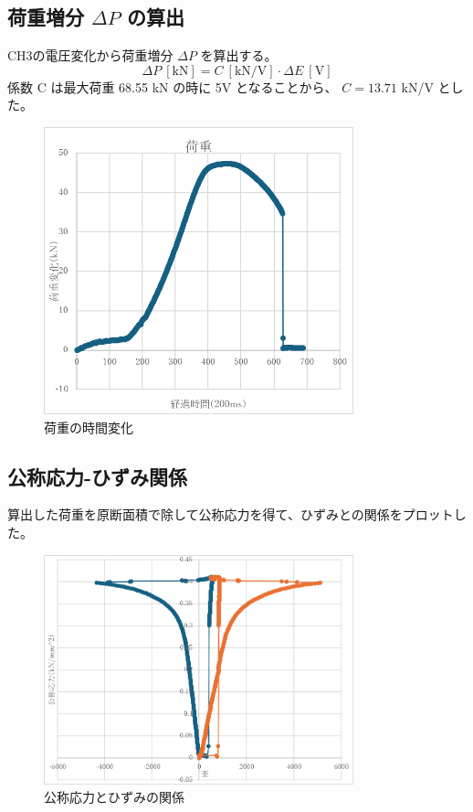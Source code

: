 \documentclass[11pt, a4paper, dvipdfmx]{jsreport}
\begin{document}
\subsection{荷重増分 $\Delta P$ の算出}
CH3の電圧変化から荷重増分 $\Delta P$ を算出する。
$$
\Delta P\ [\text{kN}] = C\ [\text{kN/V}] \cdot \Delta E\ [\text{V}]
$$
係数 C は最大荷重 68.55 kN の時に 5V となることから、 $C=13.71$ kN/V とした。
\begin{figure}[H]
    \centering
    \includegraphics[width=0.8\textwidth]{summer/ship-experiment/tension/pictures/load_change.png}
    \caption{荷重の時間変化}
    \label{fig:load_change}
\end{figure}

\subsection{公称応力-ひずみ関係}
算出した荷重を原断面積で除して公称応力を得て、ひずみとの関係をプロットした。
\begin{figure}[H]
    \centering
    \includegraphics[width=0.8\textwidth]{summer/ship-experiment/tension/pictures/stress_strain.png}
    \caption{公称応力とひずみの関係}
    \label{fig:stress_strain}
\end{figure}
\end{document}
